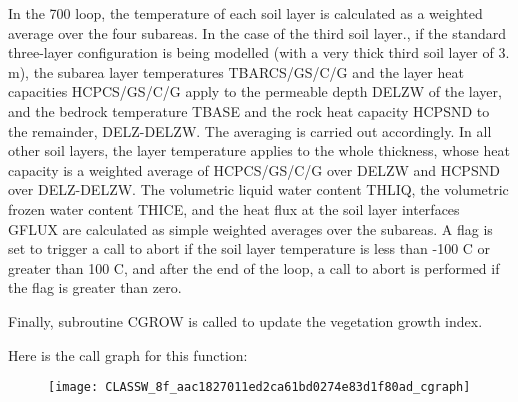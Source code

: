 In the 700 loop, the temperature of each soil layer is calculated as a weighted average over the four subareas. In the case of the third soil layer., if the standard three-\/layer configuration is being modelled (with a very thick third soil layer of 3. m), the subarea layer temperatures T\+B\+A\+R\+C\+S/\+G\+S/\+C/\+G and the layer heat capacities H\+C\+P\+C\+S/\+G\+S/\+C/\+G apply to the permeable depth D\+E\+L\+Z\+W of the layer, and the bedrock temperature T\+B\+A\+S\+E and the rock heat capacity H\+C\+P\+S\+N\+D to the remainder, D\+E\+L\+Z-\/\+D\+E\+L\+Z\+W. The averaging is carried out accordingly. In all other soil layers, the layer temperature applies to the whole thickness, whose heat capacity is a weighted average of H\+C\+P\+C\+S/\+G\+S/\+C/\+G over D\+E\+L\+Z\+W and H\+C\+P\+S\+N\+D over D\+E\+L\+Z-\/\+D\+E\+L\+Z\+W. The volumetric liquid water content T\+H\+L\+I\+Q, the volumetric frozen water content T\+H\+I\+C\+E, and the heat flux at the soil layer interfaces G\+F\+L\+U\+X are calculated as simple weighted averages over the subareas. A flag is set to trigger a call to abort if the soil layer temperature is less than -\/100 C or greater than 100 C, and after the end of the loop, a call to abort is performed if the flag is greater than zero.

Finally, subroutine C\+G\+R\+O\+W is called to update the vegetation growth index.

Here is the call graph for this function\+:
\nopagebreak
\begin{figure}[H]
\begin{center}
\leavevmode
\texttt{[image: CLASSW\_8f\_aac1827011ed2ca61bd0274e83d1f80ad\_cgraph]}
\end{center}
\end{figure}


